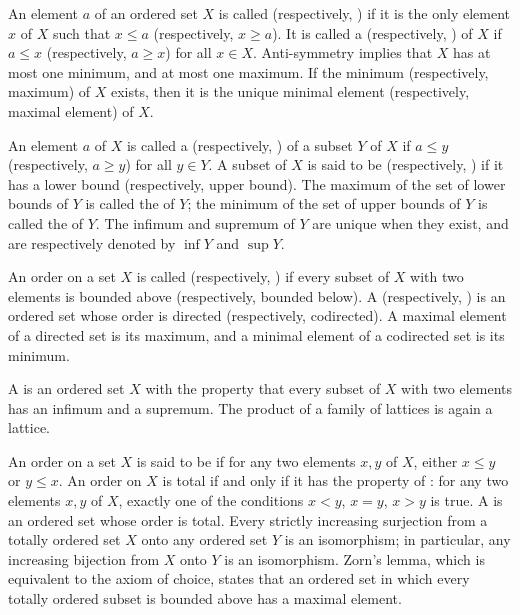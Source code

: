 \documentclass{article}
\begin{document}
An element \(a\) of an ordered set \(X\) is called 
(respectively, ) if it is the only element \(x\) of
\(X\) such that \(x \leq a\) (respectively, \(x \geq a\)).  It is
called a  (respectively, ) of
\(X\) if \(a \leq x\) (respectively, \(a \geq x\)) for all
\(x \in X\).  Anti-symmetry implies that \(X\) has at most one
minimum, and at most one maximum.  If the minimum (respectively,
maximum) of \(X\) exists, then it is the unique minimal element
(respectively, maximal element) of \(X\).

An element \(a\) of \(X\) is called a 
(respectively, ) of a subset \(Y\) of \(X\) if
\(a \leq y\) (respectively, \(a \geq y\)) for all \(y \in Y\).  A
subset of \(X\) is said to be  (respectively,
) if it has a lower bound (respectively,
upper bound).  The maximum of the set of lower bounds of \(Y\) is
called the  of \(Y\); the minimum of the set of
upper bounds of \(Y\) is called the  of \(Y\).
The infimum and supremum of \(Y\) are unique when they exist, and are
respectively denoted by \(\inf Y\) and \(\sup Y\).

An order on a set \(X\) is called  (respectively,
) if every subset of \(X\) with two elements is
bounded above (respectively, bounded below).  A  (respectively, ) is an ordered set
whose order is directed (respectively, codirected).  A maximal element
of a directed set is its maximum, and a minimal element of a
codirected set is its minimum.

A  is an ordered set \(X\) with the property that
every subset of \(X\) with two elements has an infimum and a supremum.
The product of a family of lattices is again a lattice.

An order on a set \(X\) is said to be  if for any two
elements \(x, y\) of \(X\), either \(x \leq y\) or \(y \leq x\).  An
order on \(X\) is total if and only if it has the property of
: for any two elements \(x, y\) of \(X\),
exactly one of the conditions \(x < y\), \(x = y\), \(x > y\) is true.
A  is an ordered set whose order is
total.  Every strictly increasing surjection from a totally ordered
set \(X\) onto any ordered set \(Y\) is an isomorphism; in particular,
any increasing bijection from \(X\) onto \(Y\) is an isomorphism.
Zorn's lemma, which is equivalent to the axiom of choice, states that
an ordered set in which every totally ordered subset is bounded above
has a maximal element.
\end{document}
